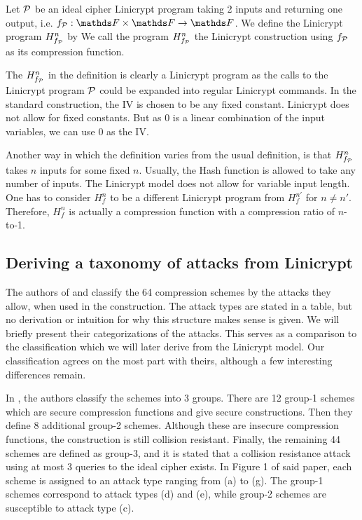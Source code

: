 \begin{defn}
    Let $\P$ be an ideal cipher Linicrypt program taking 2 inputs and returning one output, i.e. $f_\P: \F \times \F \to \F$.
    We define the Linicrypt program $H^n_{f_\P}$ by
    We call the program $\PMD{f_\P}$ the Linicrypt \MD construction using $f_\P$ as its compression function.
\end{defn}

The $\PMD{f_\P}$ in the definition is clearly a Linicrypt program as the calls to the Linicrypt program $\P$ could be expanded into regular Linicrypt commands.
In the standard \MD construction, the IV is chosen to be any fixed constant.
Linicrypt does not allow for fixed constants.
But as 0 is a linear combination of the input variables, we can use 0 as the IV.

Another way in which the definition varies from the usual definition,
is that $\PMD{f_\P}$ takes $n$ inputs for some fixed $n$.
Usually, the \MD Hash function is allowed to take any number of inputs.
The Linicrypt model does not allow for variable input length.
One has to consider $H^n_f$ to be a different Linicrypt program from $H^{n'}_f$ for $n \neq n'$.
Therefore, $H^n_f$ is actually a compression function with a compression ratio of $n$-to-1.

\subsection{Deriving a taxonomy of attacks from Linicrypt}

The authors of \cite{C:PreGovVan93} and \cite{C:BlaRogShr02} classify the 64 compression schemes by the attacks they allow,
when used in the \MD construction.
The attack types are stated in a table, but no derivation or intuition for why this structure makes sense is given.
We will briefly present their categorizations of the attacks.
This serves as a comparison to the classification which we will later derive from the Linicrypt model.
Our classification agrees on the most part with theirs,
although a few interesting differences remain.

In \cite{C:BlaRogShr02}, the authors classify the schemes into 3 groups.
There are 12 group-1 schemes which are secure compression functions and give secure \MD constructions.
Then they define 8 additional group-2 schemes.
Although these are insecure compression functions,
the \MD construction is still collision resistant. 
Finally, the remaining 44 schemes are defined as group-3,
and it is stated that a collision resistance attack using at most 3 queries to the ideal cipher exists.
In Figure 1 of said paper, each scheme is assigned to an attack type ranging from (a) to (g).
The group-1 schemes correspond to attack types (d) and (e), while group-2 schemes are susceptible to attack type (c).

